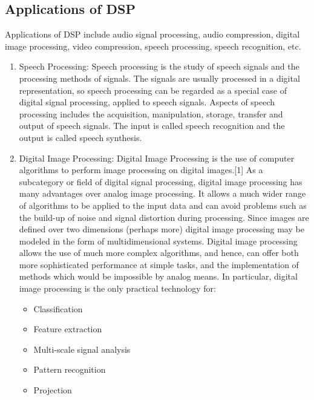 \documentclass{article}
\begin{document}
\begin{multicols}{2}
    \section{Applications of DSP\cite{wikiAppDSP}}
        Applications of DSP include audio signal processing, audio compression,
        digital image processing, video compression, speech processing, speech 
        recognition, etc.
        \begin{enumerate}
            \item Speech Processing: Speech processing is the study of speech 
            signals and the processing methods of signals. The signals are 
            usually processed in a digital representation, so speech processing
            can be regarded as a special case of digital signal processing, 
            applied to speech signals. Aspects of speech processing includes 
            the acquisition, manipulation, storage, transfer and output of 
            speech signals. The input is called speech recognition and the 
            output is called speech synthesis. 
            \cite{wikiSpeechProcessing}
            \item Digital Image Processing: Digital Image Processing is the 
            use of computer algorithms to perform image processing on digital 
            images.[1] As a subcategory or field of digital signal processing, 
            digital image processing has many advantages over analog image 
            processing. It allows a much wider range of algorithms to be 
            applied to the input data and can avoid problems such as the 
            build-up of noise and signal distortion during processing. Since 
            images are defined over two dimensions (perhaps more) digital 
            image processing may be modeled in the form of multidimensional systems. 
            Digital image processing allows the use of much more complex 
            algorithms, and hence, can offer both more sophisticated 
            performance at simple tasks, and the implementation of methods 
            which would be impossible by analog means. \newline
            In particular, digital image processing is the only practical 
            technology for: \newline
            \begin{itemize}
                \item Classification
                \item Feature extraction
                \item Multi-scale signal analysis
                \item  Pattern recognition
                \item Projection
            \end{itemize}
        \end{enumerate}


\end{multicols}
\end{document}
